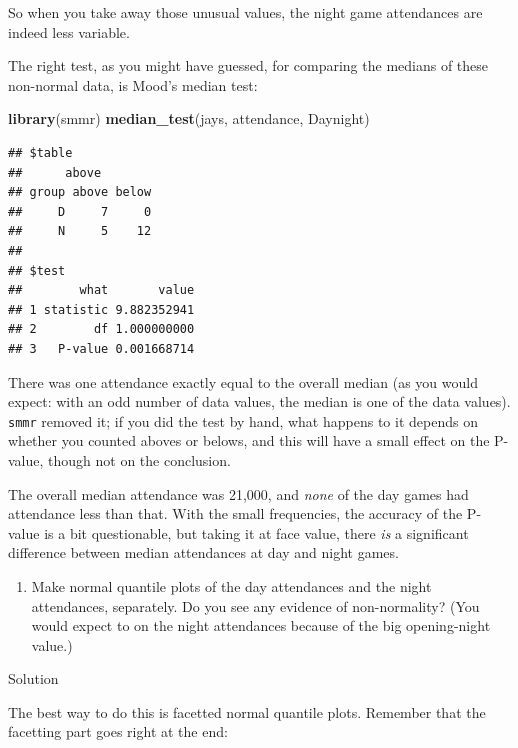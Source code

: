 \documentclass[]{tufte-book}
\newenvironment{Shaded}{}{}
\newcommand{\KeywordTok}[1]{\textcolor[rgb]{0.00,0.44,0.13}{\textbf{#1}}}
\newcommand{\NormalTok}[1]{#1}
\providecommand{\tightlist}{%
  \setlength{\itemsep}{0pt}\setlength{\parskip}{0pt}}
\theoremstyle{definition}
\theoremstyle{definition}
\theoremstyle{definition}
\theoremstyle{remark}
\begin{document}
So when you take away those unusual values, the night game attendances
are indeed less variable.

The right test, as you might have guessed, for comparing the medians of
these non-normal data, is Mood's median test:

\begin{Shaded}
\begin{Highlighting}[]
\KeywordTok{library}\NormalTok{(smmr)}
\KeywordTok{median_test}\NormalTok{(jays, attendance, Daynight)}
\end{Highlighting}
\end{Shaded}

\begin{verbatim}
## $table
##      above
## group above below
##     D     7     0
##     N     5    12
## 
## $test
##        what       value
## 1 statistic 9.882352941
## 2        df 1.000000000
## 3   P-value 0.001668714
\end{verbatim}

There was one attendance exactly equal to the overall median (as you
would expect: with an odd number of data values, the median is one of
the data values). \texttt{smmr} removed it; if you did the test by hand,
what happens to it depends on whether you counted aboves or belows, and
this will have a small effect on the P-value, though not on the
conclusion.

The overall median attendance was 21,000, and \emph{none} of the day
games had attendance less than that. With the small frequencies, the
accuracy of the P-value is a bit questionable, but taking it at face
value, there \emph{is} a significant difference between median
attendances at day and night games.

\begin{enumerate}
\def\labelenumi{(\alph{enumi})}
\setcounter{enumi}{4}
\tightlist
\item
  Make normal quantile plots of the day attendances and the night
  attendances, separately. Do you see any evidence of non-normality?
  (You would expect to on the night attendances because of the big
  opening-night value.)
\end{enumerate}

Solution

The best way to do this is facetted normal quantile plots. Remember that
the facetting part goes right at the end:
\end{document}
